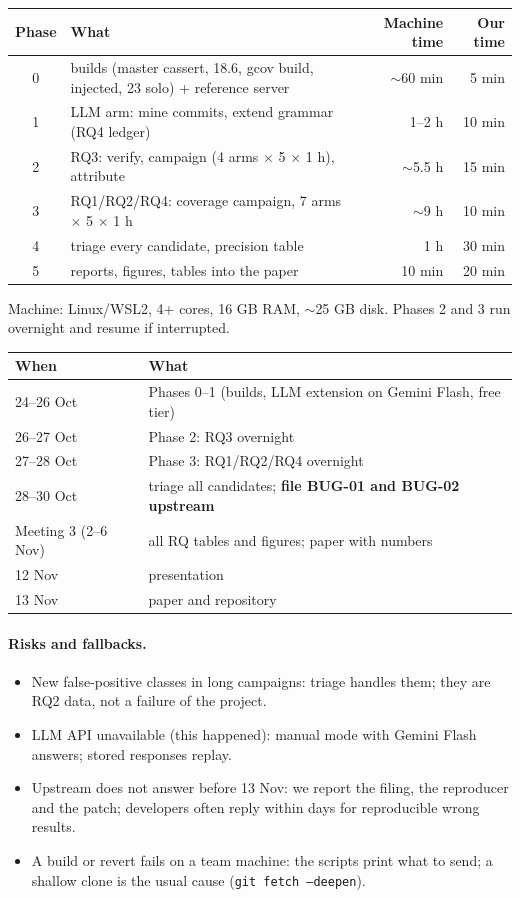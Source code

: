 \begin{center}
\small
\begin{tabularx}{\linewidth}{cXrr}
\toprule
Phase & What & Machine time & Our time \\
\midrule
0 & builds (master cassert, 18.6, gcov build, injected, 23 solo) + reference server & $\sim$60 min & 5 min \\
1 & LLM arm: mine commits, extend grammar (RQ4 ledger) & 1--2 h & 10 min \\
2 & RQ3: verify, campaign (4 arms $\times$ 5 $\times$ 1 h), attribute & $\sim$5.5 h & 15 min \\
3 & RQ1/RQ2/RQ4: coverage campaign, 7 arms $\times$ 5 $\times$ 1 h & $\sim$9 h & 10 min \\
4 & triage every candidate, precision table & 1 h & 30 min \\
5 & reports, figures, tables into the paper & 10 min & 20 min \\
\bottomrule
\end{tabularx}
\end{center}
Machine: Linux/WSL2, 4+ cores, 16 GB RAM, $\sim$25 GB disk. Phases 2 and 3
run overnight and resume if interrupted.

\begin{center}
\small
\begin{tabularx}{\linewidth}{lX}
\toprule
When & What \\
\midrule
24--26 Oct & Phases 0--1 (builds, LLM extension on Gemini Flash, free tier) \\
26--27 Oct & Phase 2: RQ3 overnight \\
27--28 Oct & Phase 3: RQ1/RQ2/RQ4 overnight \\
28--30 Oct & triage all candidates; \textbf{file BUG-01 and BUG-02 upstream} \\
Meeting 3 (2--6 Nov) & all RQ tables and figures; paper with numbers \\
12 Nov & presentation \\
13 Nov & paper and repository \\
\bottomrule
\end{tabularx}
\end{center}

\paragraph{Risks and fallbacks.}
\begin{itemize}
  \item New false-positive classes in long campaigns: triage handles them;
    they are RQ2 data, not a failure of the project.
  \item LLM API unavailable (this happened): manual mode with Gemini Flash
    answers; stored responses replay.
  \item Upstream does not answer before 13 Nov: we report the filing, the
    reproducer and the patch; \pg developers often reply within days for
    reproducible wrong results.
  \item A build or revert fails on a team machine: the scripts print what to
    send; a shallow clone is the usual cause (\texttt{git fetch --deepen}).
\end{itemize}

